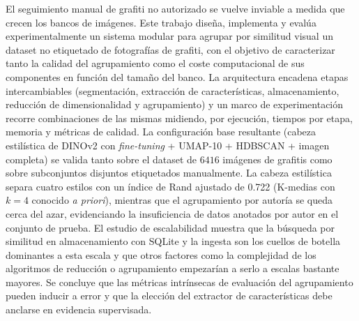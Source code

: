 El seguimiento manual de grafiti no autorizado se vuelve inviable a medida que
crecen los bancos de imágenes. Este trabajo diseña, implementa y evalúa
experimentalmente un sistema modular para agrupar por similitud visual un
dataset no etiquetado de fotografías de grafiti, con el objetivo de
caracterizar tanto la calidad del agrupamiento como el coste computacional de
sus componentes en función del tamaño del banco. La arquitectura encadena
etapas intercambiables (segmentación, extracción de características,
almacenamiento, reducción de dimensionalidad y agrupamiento) y un marco de
experimentación recorre combinaciones de las mismas midiendo, por ejecución,
tiempos por etapa, memoria y métricas de calidad. La configuración base
resultante (cabeza estilística de DINOv2 con \textit{fine-tuning} + UMAP-10 +
HDBSCAN + imagen completa) se valida tanto sobre el dataset de $6416$ imágenes
de grafitis como sobre subconjuntos disjuntos etiquetados manualmente. La
cabeza estilística separa cuatro estilos con un índice de Rand ajustado de
0.722 (K-medias con $k{=}4$ conocido \textit{a priori}), mientras que el
agrupamiento por autoría se queda cerca del azar, evidenciando la insuficiencia
de datos anotados por autor en el conjunto de prueba. El estudio de
escalabilidad muestra que la búsqueda por similitud en almacenamiento con
SQLite y la ingesta son los cuellos de botella dominantes a esta escala y que
otros factores como la complejidad de los algoritmos de reducción o
agrupamiento empezarían a serlo a escalas bastante mayores. Se concluye que las
métricas intrínsecas de evaluación del agrupamiento pueden inducir a error y
que la elección del extractor de características debe anclarse en evidencia
supervisada.
